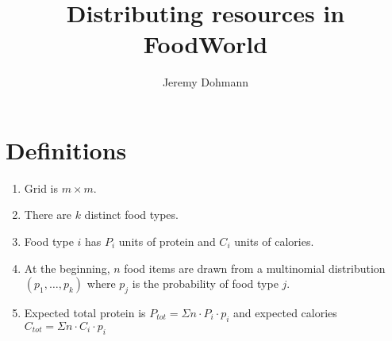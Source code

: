 \documentclass[12pt]{article}
\begin{document}
\title{Distributing resources in FoodWorld}
\author{Jeremy Dohmann}
	
\maketitle

\section{Definitions}

\begin{enumerate}
	\item Grid is $m \times m$.
	
	\item There are $k$ distinct food types.
	
	\item Food type $i$ has $P_i$ units of protein and $C_i$ units of calories.
	
	\item At the beginning, $n$ food items are drawn from a multinomial distribution $(p_1,\ldots,p_k)$ where $p_j$ is the probability of food type $j$.
	
	
	\item Expected total protein is $P_{tot} = \Sigma n \cdot P_i \cdot p_i$ and expected calories $C_{tot} = \Sigma n \cdot C_i \cdot p_i$
\end{enumerate}




	
\end{document}
